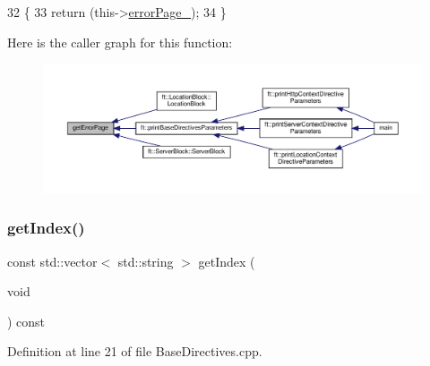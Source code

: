 \begin{DoxyCode}
32     \{
33         \textcolor{keywordflow}{return} (this->\hyperlink{classft_1_1_base_directives_a5c0d388109f086503961de84fe3fce90}{errorPage\_});
34     \}
\end{DoxyCode}
Here is the caller graph for this function\+:
\nopagebreak
\begin{figure}[H]
\begin{center}
\leavevmode
\includegraphics[width=350pt]{classft_1_1_base_directives_a3cb0c21f17781de392d5ee09d7190caf_icgraph}
\end{center}
\end{figure}
\mbox{\label{classft_1_1_base_directives_a018f34a5ffd66e891494b5c0ee69177b}} 
\subsubsection{\texorpdfstring{get\+Index()}{getIndex()}}
{\footnotesize\ttfamily const std\+::vector$<$ std\+::string $>$ get\+Index (\begin{DoxyParamCaption}\item[{void}]{ }\end{DoxyParamCaption}) const\hspace{0.3cm}{\ttfamily [inherited]}}



Definition at line 21 of file Base\+Directives.\+cpp.


